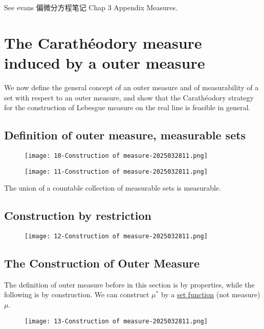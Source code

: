 See evans 偏微分方程笔记 Chap 3 Appendix Measures.

\section{The Carathéodory measure induced by a outer measure}

We now define the general concept of an outer measure and of measurability of a set with respect to an outer measure, and show that the Carathéodory strategy for the construction of Lebesgue measure on the real line is feasible in general.

\subsection{Definition of outer measure, measurable sets}

\begin{figure}[H]
\centering
\texttt{[image: 10-Construction of measure-2025032811.png]}
\label{}
\end{figure}

\begin{figure}[H]
\centering
\texttt{[image: 11-Construction of measure-2025032811.png]}
\label{}
\end{figure}

The union of a countable collection of measurable sets is measurable.

\subsection{Construction by restriction}

\begin{figure}[H]
\centering
\texttt{[image: 12-Construction of measure-2025032811.png]}
\label{}
\end{figure}

\subsection{The Construction of Outer Measure}

The definition of outer measure before in this section is by properties, while the following is by construction. We can construct $\mu^{*}$ by a \underline{set function} (not measure) $\mu$.
\begin{figure}[H]
\centering
\texttt{[image: 13-Construction of measure-2025032811.png]}
\label{}
\end{figure}

